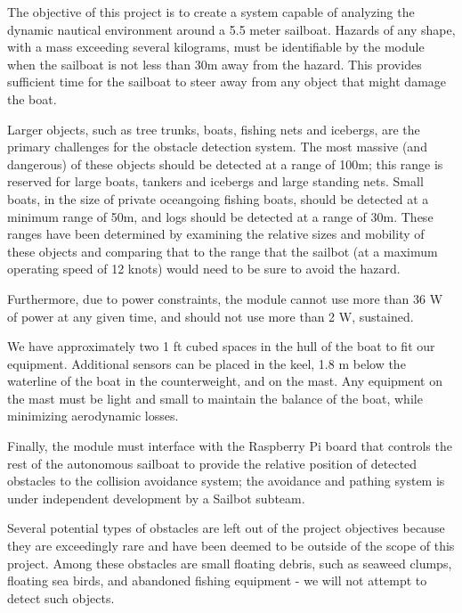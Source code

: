 The objective of this project is to create a system capable of analyzing the dynamic nautical environment around a 5.5 meter sailboat. Hazards of any shape, with a mass exceeding several kilograms, must be identifiable by the module when the sailboat is not less than 30m away from the hazard. This provides sufficient time for the sailboat to steer away from any object that might damage the boat.

Larger objects, such as tree trunks, boats, fishing nets and icebergs, are the primary challenges for the obstacle detection system. The most massive (and dangerous) of these objects should be detected at a range of 100m; this range is reserved for large boats, tankers and icebergs and large standing nets. Small boats, in the size of private oceangoing fishing boats, should be detected at a minimum range of 50m, and logs should be detected at a range of 30m. These ranges have been determined by examining the relative sizes and mobility of these objects and comparing that to the range that the sailbot (at a maximum operating speed of 12 knots) would need to be sure to avoid the hazard.

Furthermore, due to power constraints, the module cannot use more than 36 W of power at any given time, and should not use more than 2 W, sustained.

We have approximately two 1 ft cubed spaces in the hull of the boat to fit our equipment. Additional sensors can be placed in the keel, 1.8 m below the waterline of the boat in the counterweight, and on the mast. Any equipment on the mast must be light and small to maintain the balance of the boat, while minimizing aerodynamic losses.

Finally, the module must interface with the Raspberry Pi board that controls the rest of the autonomous sailboat to provide the relative position of detected obstacles to the collision avoidance system; the avoidance and pathing system is under independent development by a Sailbot subteam.

Several potential types of obstacles are left out of the project objectives because they are exceedingly rare and have been deemed to be outside of the scope of this project. Among these obstacles are small floating debris, such as seaweed clumps, floating sea birds, and abandoned fishing equipment - we will not attempt to detect such objects.